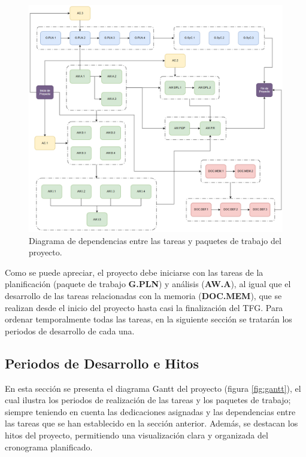 \begin{figure}[H]
    \centering
    \includegraphics[width=\textwidth]{figures/dependencias_tareas.png}
    \caption{Diagrama de dependencias entre las tareas y paquetes de trabajo del proyecto.}
    \label{fig:dependencias_tareas}
\end{figure}

Como se puede apreciar, el proyecto debe iniciarse con las tareas de la planificación (paquete de trabajo \textbf{G.PLN}) y análisis (\textbf{AW.A}), al igual que el desarrollo de las tareas relacionadas con la memoria (\textbf{DOC.MEM}), que se realizan desde el inicio del proyecto hasta casi la finalización del TFG. Para ordenar temporalmente todas las tareas, en la siguiente sección se tratarán los periodos de desarrollo de cada una.

\newpage

\subsection{Periodos de Desarrollo e Hitos}

En esta sección se presenta el diagrama Gantt del proyecto (figura \ref{fig:gantt}), el cual ilustra los periodos de realización de las tareas y los paquetes de trabajo; siempre teniendo en cuenta las dedicaciones asignadas y las dependencias entre las tareas que se han establecido en la sección anterior. Además, se destacan los hitos del proyecto, permitiendo una visualización clara y organizada del cronograma planificado.

